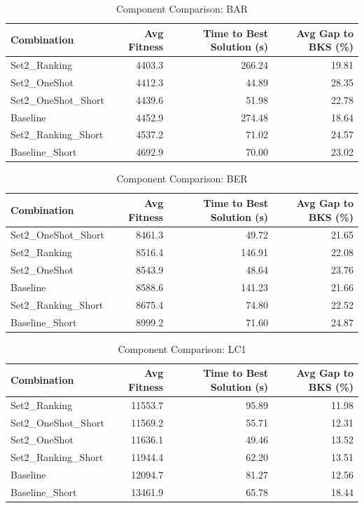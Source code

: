 \documentclass{article}
\begin{document}
\begin{table}[htbp]
\centering
\caption{Component Comparison: BAR}
\label{tab:comparison_bar}
\begin{tabular}{lrrr}
\toprule
Combination & Avg Fitness & Time to Best Solution (s) & Avg Gap to BKS (\%) \\
\midrule
Set2\_Ranking & 4403.3 & 266.24 & 19.81 \\
Set2\_OneShot & 4412.3 & 44.89 & 28.35 \\
Set2\_OneShot\_Short & 4439.6 & 51.98 & 22.78 \\
Baseline & 4452.9 & 274.48 & 18.64 \\
Set2\_Ranking\_Short & 4537.2 & 71.02 & 24.57 \\
Baseline\_Short & 4692.9 & 70.00 & 23.02 \\
\bottomrule
\end{tabular}
\end{table}

\begin{table}[htbp]
\centering
\caption{Component Comparison: BER}
\label{tab:comparison_ber}
\begin{tabular}{lrrr}
\toprule
Combination & Avg Fitness & Time to Best Solution (s) & Avg Gap to BKS (\%) \\
\midrule
Set2\_OneShot\_Short & 8461.3 & 49.72 & 21.65 \\
Set2\_Ranking & 8516.4 & 146.91 & 22.08 \\
Set2\_OneShot & 8543.9 & 48.64 & 23.76 \\
Baseline & 8588.6 & 141.23 & 21.66 \\
Set2\_Ranking\_Short & 8675.4 & 74.80 & 22.52 \\
Baseline\_Short & 8999.2 & 71.60 & 24.87 \\
\bottomrule
\end{tabular}
\end{table}

\begin{table}[htbp]
\centering
\caption{Component Comparison: LC1}
\label{tab:comparison_lc1}
\begin{tabular}{lrrr}
\toprule
Combination & Avg Fitness & Time to Best Solution (s) & Avg Gap to BKS (\%) \\
\midrule
Set2\_Ranking & 11553.7 & 95.89 & 11.98 \\
Set2\_OneShot\_Short & 11569.2 & 55.71 & 12.31 \\
Set2\_OneShot & 11636.1 & 49.46 & 13.52 \\
Set2\_Ranking\_Short & 11944.4 & 62.20 & 13.51 \\
Baseline & 12094.7 & 81.27 & 12.56 \\
Baseline\_Short & 13461.9 & 65.78 & 18.44 \\
\bottomrule
\end{tabular}
\end{table}
\end{document}
